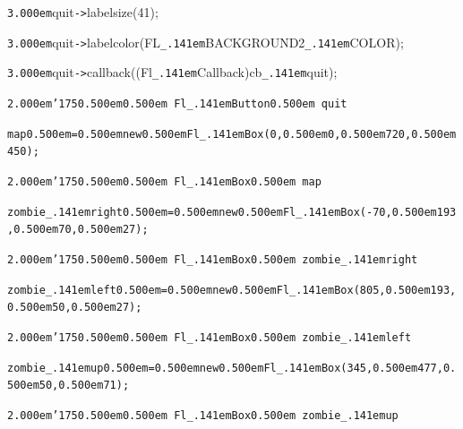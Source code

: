 \documentclass[12pt]{article}
\begin{document}
\noindent
{}{\tt\mc \kern3.000em}quit{\tt -}{\tt >}labelsize(41);

\noindent
{}{\tt\mc \kern3.000em}quit{\tt -}{\tt >}labelcolor(FL{\tt\_\kern.141em}BACKGROUND2{\tt\_\kern.141em}COLOR);

\noindent
{}{\tt\mc \kern3.000em}quit{\tt -}{\tt >}callback((Fl{\tt\_\kern.141em}Callback{\tt *})cb{\tt\_\kern.141em}quit);

\noindent
{}{\tt\mc \kern2.000em}{\tt\char'175}{\tt\mc \kern0.500em}\tt\mc {\tt /}{\tt /}\kern0.500em Fl{\tt\_\kern.141em}Button{\tt *}\kern0.500em quit

\noindent
\tt{}map{\tt\mc \kern0.500em}={\tt\mc \kern0.500em}new{\tt\mc \kern0.500em}Fl{\tt\_\kern.141em}Box(0,{\tt\mc \kern0.500em}0,{\tt\mc \kern0.500em}720,{\tt\mc \kern0.500em}450);

\noindent
{}{\tt\mc \kern2.000em}{\tt\char'175}{\tt\mc \kern0.500em}\tt\mc {\tt /}{\tt /}\kern0.500em Fl{\tt\_\kern.141em}Box{\tt *}\kern0.500em map

\noindent
\tt{}zombie{\tt\_\kern.141em}right{\tt\mc \kern0.500em}={\tt\mc \kern0.500em}new{\tt\mc \kern0.500em}Fl{\tt\_\kern.141em}Box({\tt -}70,{\tt\mc \kern0.500em}193,{\tt\mc \kern0.500em}70,{\tt\mc \kern0.500em}27);

\noindent
{}{\tt\mc \kern2.000em}{\tt\char'175}{\tt\mc \kern0.500em}\tt\mc {\tt /}{\tt /}\kern0.500em Fl{\tt\_\kern.141em}Box{\tt *}\kern0.500em zombie{\tt\_\kern.141em}right

\noindent
\tt{}zombie{\tt\_\kern.141em}left{\tt\mc \kern0.500em}={\tt\mc \kern0.500em}new{\tt\mc \kern0.500em}Fl{\tt\_\kern.141em}Box(805,{\tt\mc \kern0.500em}193,{\tt\mc \kern0.500em}50,{\tt\mc \kern0.500em}27);

\noindent
{}{\tt\mc \kern2.000em}{\tt\char'175}{\tt\mc \kern0.500em}\tt\mc {\tt /}{\tt /}\kern0.500em Fl{\tt\_\kern.141em}Box{\tt *}\kern0.500em zombie{\tt\_\kern.141em}left

\noindent
\tt{}zombie{\tt\_\kern.141em}up{\tt\mc \kern0.500em}={\tt\mc \kern0.500em}new{\tt\mc \kern0.500em}Fl{\tt\_\kern.141em}Box(345,{\tt\mc \kern0.500em}477,{\tt\mc \kern0.500em}50,{\tt\mc \kern0.500em}71);

\noindent
{}{\tt\mc \kern2.000em}{\tt\char'175}{\tt\mc \kern0.500em}\tt\mc {\tt /}{\tt /}\kern0.500em Fl{\tt\_\kern.141em}Box{\tt *}\kern0.500em zombie{\tt\_\kern.141em}up
\end{document}
